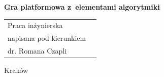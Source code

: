 \documentclass[12pt,a4paper,oneside]{book}
\theoremstyle{definition}
\numberwithin{equation}{chapter}
\begin{document}
\begin{titlepage}
\begin{center}
{\LARGE \textbf{Gra platformowa z~elementami algorytmiki} \\[1.5cm] }



\begin{flushright}
\large
  \begin{tabular}{ll}
	Praca inżynierska\\
	napisana pod kierunkiem\\ 
	dr. Romana Czapli
  \end{tabular}
\end{flushright}


\vfill

{\large Kraków \the\year}

\end{center}
\end{titlepage}


\setcounter{page}{2}

\tableofcontents
\newpage

\end{document}
